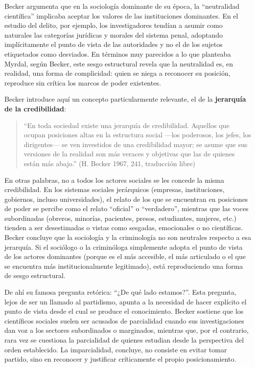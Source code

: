 \documentclass[
  spanish,
  letterpaper,
  DIV=11,
  numbers=noendperiod]{scrreprt}
\begin{document}
Becker argumenta que en la sociología dominante de su época, la
``neutralidad científica'' implicaba aceptar los valores de las
instituciones dominantes. En el estudio del delito, por ejemplo, los
investigadores tendían a asumir como naturales las categorías jurídicas
y morales del sistema penal, adoptando implícitamente el punto de vista
de las autoridades y no el de los sujetos etiquetados como desviados. En
términos muy parecidos a lo que planteaba Myrdal, según Becker, este
sesgo estructural revela que la neutralidad es, en realidad, una forma
de complicidad: quien se niega a reconocer su posición, reproduce sin
crítica los marcos de poder existentes.

Becker introduce aquí un concepto particularmente relevante, el de la
\textbf{jerarquía de la credibilidad}:

\begin{quote}
``En toda sociedad existe una jerarquía de credibilidad. Aquellos que
ocupan posiciones altas en la estructura social ---los poderosos, los
jefes, los dirigentes--- se ven investidos de una credibilidad mayor; se
asume que sus versiones de la realidad son más veraces y objetivas que
las de quienes están más abajo.'' (H. Becker 1967, 241, traducción
libre)
\end{quote}

En otras palabras, no a todos los actores sociales se les concede la
misma credibilidad. En los sistemas sociales jerárquicos (empresas,
instituciones, gobiernos, incluso universidades), el relato de los que
se encuentran en posiciones de poder se percibe como el relato
``oficial'' o ``verdadero'', mientras que las voces subordinadas
(obreros, minorías, pacientes, presos, estudiantes, mujeres, etc.)
tienden a ser desestimadas o vistas como sesgadas, emocionales o no
científicas. Becker concluye que la sociología y la criminología no son
neutrales respecto a esa jerarquía. Si el sociólogo o la criminóloga
simplemente adopta el punto de vista de los actores dominantes (porque
es el más accesible, el más articulado o el que se encuentra más
institucionalmente legitimado), está reproduciendo una forma de sesgo
estructural.

De ahí su famosa pregunta retórica: ``¿De qué lado estamos?''. Esta
pregunta, lejos de ser un llamado al partidismo, apunta a la necesidad
de hacer explícito el punto de vista desde el cual se produce el
conocimiento. Becker sostiene que los científicos sociales suelen ser
acusados de parcialidad cuando sus investigaciones dan voz a los
sectores subordinados o marginados, mientras que, por el contrario, rara
vez se cuestiona la parcialidad de quienes estudian desde la perspectiva
del orden establecido. La imparcialidad, concluye, no consiste en evitar
tomar partido, sino en reconocer y justificar críticamente el propio
posicionamiento.
\end{document}
